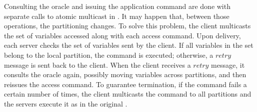 Consulting the oracle and issuing the application command are done with separate calls to atomic multicast in \dssmr{}.
It may happen that, between those operations, the partitioning changes.
To solve this problem, the client multicasts the set of variables accessed along with each access command.
Upon delivery, each server checks the set of variables sent by the client.
If all variables in the set belong to the local partition, the command is executed; otherwise, a $retry$ message is sent back to the client.
When the client receives a $retry$ message, it consults the oracle again, possibly moving variables across partitions, and then reissues the access command.
To guarantee termination, if the command fails a certain number of times, the client multicasts the command to all partitions and the servers execute it as in the original \ssmr{}.

%

